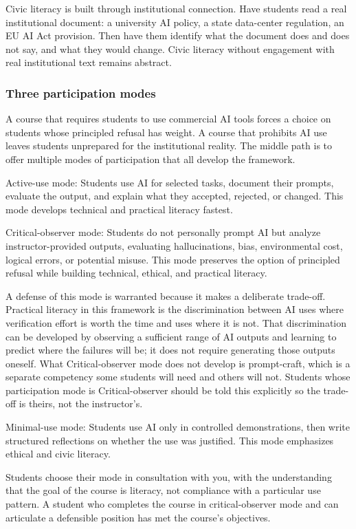 \documentclass[12pt]{article}
\begin{document}
Civic literacy is built through institutional connection. Have students read a real institutional document: a university AI policy, a state data-center regulation, an EU AI Act provision. Then have them identify what the document does and does not say, and what they would change. Civic literacy without engagement with real institutional text remains abstract.

\subsubsection*{Three participation modes}

A course that requires students to use commercial AI tools forces a choice on students whose principled refusal has weight. A course that prohibits AI use leaves students unprepared for the institutional reality. The middle path is to offer multiple modes of participation that all develop the framework.

Active-use mode: Students use AI for selected tasks, document their prompts, evaluate the output, and explain what they accepted, rejected, or changed. This mode develops technical and practical literacy fastest.

Critical-observer mode: Students do not personally prompt AI but analyze instructor-provided outputs, evaluating hallucinations, bias, environmental cost, logical errors, or potential misuse. This mode preserves the option of principled refusal while building technical, ethical, and practical literacy.

A defense of this mode is warranted because it makes a deliberate trade-off. Practical literacy in this framework is the discrimination between AI uses where verification effort is worth the time and uses where it is not. That discrimination can be developed by observing a sufficient range of AI outputs and learning to predict where the failures will be; it does not require generating those outputs oneself. What Critical-observer mode does not develop is prompt-craft, which is a separate competency some students will need and others will not. Students whose participation mode is Critical-observer should be told this explicitly so the trade-off is theirs, not the instructor's.

Minimal-use mode: Students use AI only in controlled demonstrations, then write structured reflections on whether the use was justified. This mode emphasizes ethical and civic literacy.

Students choose their mode in consultation with you, with the understanding that the goal of the course is literacy, not compliance with a particular use pattern. A student who completes the course in critical-observer mode and can articulate a defensible position has met the course's objectives.
\end{document}
